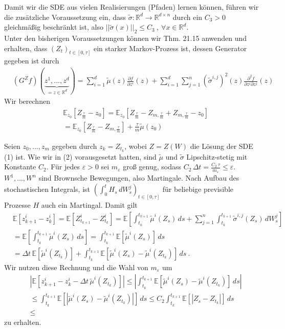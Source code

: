 \documentclass[12pt]{article}
\newcommand{\E}{\mathbb{E}}
\newcommand{\R}{\mathbb{R}}
\newcommand{\tmu}{\widetilde{\mu}}
\newcommand{\tsig}{\widetilde{\sigma}}
\begin{document}
	\newpage
	\noindent

	Damit wir die SDE aus vielen Realisierungen (Pfaden) lernen können, führen wir die zusätzliche Voraussetzung ein, dass $\tsig : \R^d \rightarrow \R^{d \times n}$ durch ein $C_3 > 0$ gleichmäßig beschränkt ist, also $||\tsig(x)||_2 \leq C_3 \ , \ \forall x \in \R^d$.\\
	Unter den bisherigen Voraussetzungen können wir \cite{PfaffiSkript} Thm. 21.15 anwenden und erhalten, dass $(Z_t)_{t \in [0,\tau]}$ ein starker Markov-Prozess ist, dessen Generator gegeben ist durch
	\begin{align*}
	& (G^Zf)(\underbrace{z^1,...,z^d}_{=z \in \R^d}) = \sum\limits_{i=1}^d \tmu(z) \frac{\partial f}{\partial z^i}(z) + \sum\limits_{i=1}^d \sum\limits_{j=1}^n (\tsig^{i,j})^2(z) \frac{\partial^2 f}{\partial z^i \partial z^j}(z)
	\end{align*}
	Wir berechnen
	\begin{align*}
	& \E_{z_0}[Z_{\frac{\tau}{m}} - z_0] = \E_{z_0}[Z_{\frac{\tau}{m}} - Z_{m,\frac{\tau}{m}} + Z_{m,\frac{\tau}{m}} - z_0]\\
	& = \E_{z_0}[Z_{\frac{\tau}{m}} - Z_{m,\frac{\tau}{m}}] + \frac{\tau}{m} \tmu(z_0)
	\end{align*}

	\newpage
	Seien $z_0,...,z_m$ gegeben durch $z_k = Z_{t_k}$, wobei $Z = Z(W)$ die Lösung der SDE (1) ist. Wie wir in (2) vorausgesetzt hatten, sind $\tmu$ und $\tsig$ Lipschitz-stetig mit Konstante $C_2$. Für jedes $\varepsilon > 0$ sei $m_\varepsilon$ groß genug, sodass $C_2 \, \Delta t = \frac{C_2 \, \tau}{m_\varepsilon} \leq \varepsilon$.\\
	$W^1,...,W^n$ sind Brownsche Bewegungen, also Martingale. Nach Aufbau des stochastischen Integrals, ist $\left(\int_0^t H_s \, dW^j_s \right)_{t \in [0,\tau]}$ für beliebige previsible Prozesse $H$ auch ein Martingal. Damit gilt
	\begin{align*}
		& \E[z^i_{k+1}-z^i_k] = \E[Z^i_{t_{k+1}}-Z^i_{t_k}] = \E\left[ \int_{t_k}^{t_{k+1}} \tmu^i(Z_s) \, ds + \sum\limits_{j=1}^n \int_{t_k}^{t_{k+1}} \tsig^{i,j}(Z_s) \, dW^j_s \right]\\
		& = \E\left[ \int_{t_k}^{t_{k+1}} \tmu^i(Z_s) \, ds \right] = \int_{t_k}^{t_{k+1}} \E[\tmu^i(Z_s)] \, ds\\
		& = \Delta t \, \E[\tmu^i(Z_{t_k})] + \int_{t_k}^{t_{k+1}} \E[\tmu^i(Z_s)-\tmu^i(Z_{t_k})] \, ds \ .
	\end{align*}
	Wir nutzen diese Rechnung und die Wahl von $m_\varepsilon$ um
	\begin{align*}
		& \left| \E[z^i_{k+1}-z^i_k - \Delta t \, \tmu^i(Z_{t_k})] \right| \leq \left| \int_{t_k}^{t_{k+1}} \E[\tmu^i(Z_s)-\tmu^i(Z_{t_k})] \, ds \right|\\
		& \leq \int_{t_k}^{t_{k+1}} \E[|\tmu^i(Z_s)-\tmu^i(Z_{t_k})|] \, ds \leq C_2 \int_{t_k}^{t_{k+1}} \E[|Z_s-Z_{t_k}|] \, ds\\
		& \leq
	\end{align*}
	zu erhalten.
\end{document}
